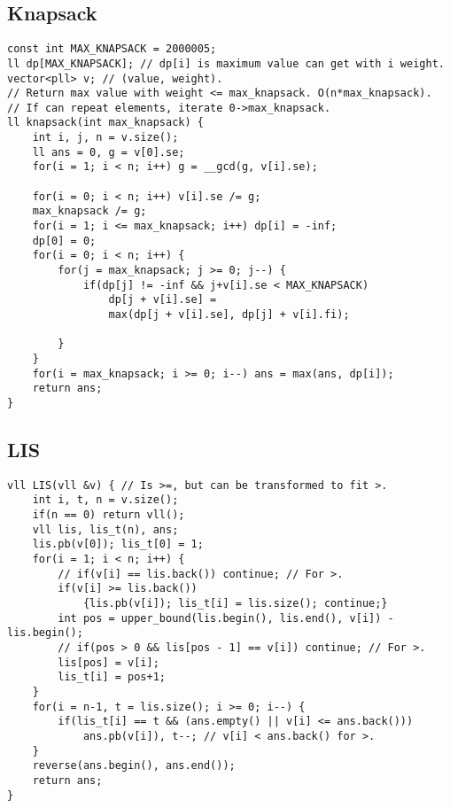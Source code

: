 \documentclass[a4paper]{article}
\begin{document}
\subsection*{Knapsack}
\begin{multicols}{2}
\begin{verbatim}
const int MAX_KNAPSACK = 2000005;
ll dp[MAX_KNAPSACK]; // dp[i] is maximum value can get with i weight.
vector<pll> v; // (value, weight).
// Return max value with weight <= max_knapsack. O(n*max_knapsack).
// If can repeat elements, iterate 0->max_knapsack.
ll knapsack(int max_knapsack) {
    int i, j, n = v.size();
    ll ans = 0, g = v[0].se;
    for(i = 1; i < n; i++) g = __gcd(g, v[i].se);
    
    for(i = 0; i < n; i++) v[i].se /= g;
    max_knapsack /= g;
    for(i = 1; i <= max_knapsack; i++) dp[i] = -inf;
    dp[0] = 0;
    for(i = 0; i < n; i++) {
        for(j = max_knapsack; j >= 0; j--) {
            if(dp[j] != -inf && j+v[i].se < MAX_KNAPSACK)
                dp[j + v[i].se] = 
                max(dp[j + v[i].se], dp[j] + v[i].fi);
                
        }
    }
    for(i = max_knapsack; i >= 0; i--) ans = max(ans, dp[i]);
    return ans;
}
\end{verbatim}
\end{multicols}
\subsection*{LIS}
\begin{multicols}{2}
\begin{verbatim}
vll LIS(vll &v) { // Is >=, but can be transformed to fit >.
    int i, t, n = v.size();
    if(n == 0) return vll();
    vll lis, lis_t(n), ans;
    lis.pb(v[0]); lis_t[0] = 1;
    for(i = 1; i < n; i++) {
        // if(v[i] == lis.back()) continue; // For >.
        if(v[i] >= lis.back())
            {lis.pb(v[i]); lis_t[i] = lis.size(); continue;}
        int pos = upper_bound(lis.begin(), lis.end(), v[i]) - lis.begin();
        // if(pos > 0 && lis[pos - 1] == v[i]) continue; // For >.
        lis[pos] = v[i];
        lis_t[i] = pos+1;
    }
    for(i = n-1, t = lis.size(); i >= 0; i--) {
        if(lis_t[i] == t && (ans.empty() || v[i] <= ans.back()))
            ans.pb(v[i]), t--; // v[i] < ans.back() for >.
    }
    reverse(ans.begin(), ans.end());
    return ans;
}
\end{verbatim}
\end{multicols}
\end{document}
